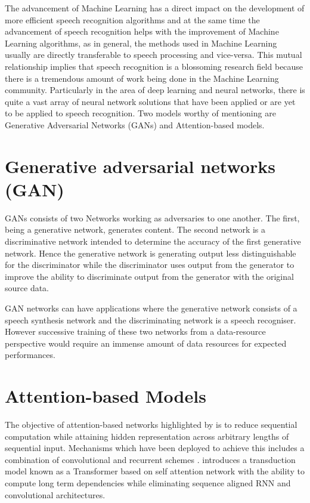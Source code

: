 The advancement of Machine Learning has a direct impact on the development of more efficient speech recognition algorithms and at the same time the advancement of speech recognition helps with the improvement of Machine Learning algorithms, as in general, the methods used in Machine Learning usually are directly transferable to speech processing and vice-versa.  This mutual relationship implies that speech recognition is a blossoming research field because there is a tremendous amount of work being done in the Machine Learning community.   Particularly in the area of deep learning and neural networks, there is quite a vast array of neural network solutions that have been applied or are yet to be applied to speech recognition.  Two models worthy of mentioning are Generative Adversarial Networks (GANs) and Attention-based models. 


\section{Generative adversarial networks (GAN)}

GANs consists of two Networks working as adversaries to one another.  The first, being a generative network, generates content.  The second network is a discriminative network intended to determine the accuracy of the first generative network.  Hence the generative network is generating output less distinguishable for the discriminator while the discriminator uses output from the generator to improve the ability to discriminate output from the generator with the original source data.

GAN networks can have applications where the generative network consists of a speech synthesis network and the discriminating network is  a speech recogniser.  However successive training of these two networks from a data-resource perspective would require an immense amount of data resources for expected performances. 

\section{Attention-based Models}

The objective of attention-based networks highlighted by  \cite{vaswani2017attention} is to reduce sequential computation while attaining hidden representation across arbitrary lengths of sequential input. Mechanisms which have been deployed to achieve this includes a combination of convolutional and recurrent schemes \citep{kaiser2016can,kalchbrenner2016neural, gehring2017convolutional}. \cite{vaswani2017attention} introduces a transduction model known as a Transformer based on self attention network with the ability to compute long term dependencies while eliminating sequence aligned RNN and convolutional architectures.

